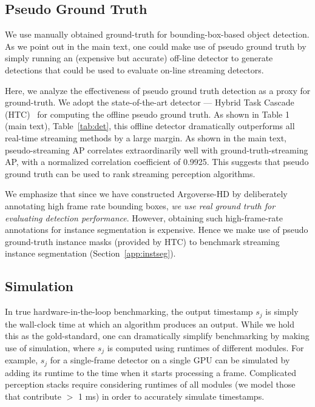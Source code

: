 \subsection{Pseudo Ground Truth}
\label{app:pseudo-gt}
We use manually obtained ground-truth for bounding-box-based object detection. As we point out in the main text, one could make use of pseudo ground truth by simply running an (expensive but accurate) off-line detector to generate detections that could be used to evaluate on-line streaming detectors.

Here, we analyze the effectiveness of pseudo ground truth detection as a proxy for ground-truth.
We adopt the state-of-the-art detector --- Hybrid Task Cascade (HTC)~\cite{chen2019hybrid} for computing the offline pseudo ground truth. As shown in 
\ifstandalonesupplement
    Table 1 (main text),
\else
    Table~\ref{tab:det},
\fi
this offline detector dramatically outperforms all real-time streaming methods by a large margin. As shown in the main text, pseudo-streaming AP correlates extraordinarily well with ground-truth-streaming AP, with a normalized correlation coefficient of 0.9925. This suggests that pseudo ground truth can be used to rank streaming perception algorithms. 

We emphasize that since we have constructed Argoverse-HD by deliberately annotating high frame rate  bounding boxes, {\em we use real ground truth for evaluating detection performance}. However, obtaining such high-frame-rate annotations for instance segmentation is expensive. Hence we make use of pseudo ground-truth instance masks (provided by HTC) to benchmark streaming instance segmentation (Section~\ref{app:instseg}).



\subsection{Simulation}
\label{app:simulation}



In true hardware-in-the-loop benchmarking, the output timestamp $s_j$ is simply the wall-clock time at which an algorithm produces an output. While we hold this as the gold-standard, one can dramatically simplify benchmarking by making use of simulation, where $s_j$ is computed using runtimes of different modules. For example, $s_j$ for a single-frame detector on a single GPU can be simulated by adding its runtime to the time when it starts processing a frame. Complicated perception stacks require considering runtimes of all modules (we model those that contribute $>$ 1 ms) in order to accurately simulate timestamps.

